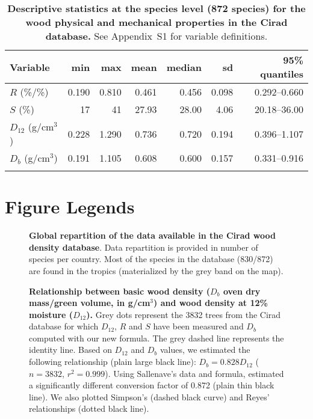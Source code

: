 \documentclass[a4paper, 12pt, leqno, dvipsnames]{article}\usepackage[]{graphicx}\usepackage[]{color}
\begin{document}
\newpage

  \begin{longtable}{@{}lrrrrrr@{}} 
    \caption{\textbf{Descriptive statistics at the species level (872 species) for the
      wood physical and mechanical properties in the Cirad database.}
      See Appendix~S1 for variable definitions.}\label{tab:Stat}\\
    \toprule
    Variable & min & max & mean & median & sd & 95\% quantiles \\
    \midrule
    $R$ (\%/\%) & 0.190 & 0.810 & 0.461 & 0.456 & 0.098 & 0.292--0.660 \\
    $S$ (\%) & 17 & 41 & 27.93 & 28.00 & 4.06 & 20.18--36.00 \\
    $D_{12}$ (g/cm$^3$) & 0.228 & 1.290 & 0.736 & 0.720 & 0.194 & 0.396--1.107 \\
    $D_b$ (g/cm$^3$) &  0.191 & 1.105 & 0.608 & 0.600 & 0.157 & 0.331--0.916 \\
    \bottomrule\\
  \end{longtable}

\newpage

\section*{Figure Legends}

\begin{figure}[!h] 
\caption{\textbf{Global repartition of the data available in the Cirad wood density database}. Data repartition is provided in number of species per country. Most of the species in the database (830/872) are found in the tropics (materialized by the grey band on the map).}\label{fig:Location}
\end{figure}

\begin{figure}[!h] 
  \caption{\textbf{Relationship between basic wood density ($D_b$ oven dry mass/green volume, in g/cm$^3$) and wood density at 12\% moisture ($D_{12}$).} Grey dots represent the 3832 trees from the Cirad database for which $D_{12}$, $R$ and $S$ have been measured and $D_b$ computed with our new formula. The grey dashed line represents the identity line. Based on $D_{12}$ and $D_b$ values, we estimated the following relationship (plain large black line): $D_b=0.828 D_{12}$ ($n=3832$, $r^2=0.999$). Using Sallenave's data and formula, \citet{Chave2006} estimated a significantly different conversion factor of 0.872 (plain thin black line). We also plotted Simpson's (dashed black curve) and Reyes' relationships (dotted black line).}\label{fig:Db-D12}
  \end{figure}
\end{document}
